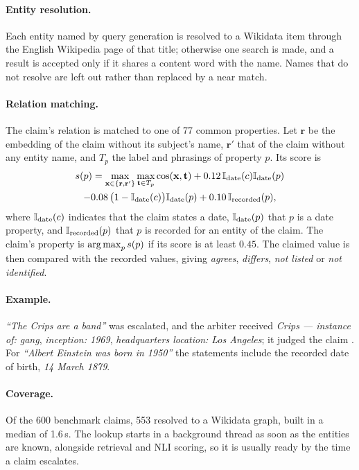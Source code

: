 \paragraph{Entity resolution.} Each entity named by query generation is resolved to a Wikidata item through the English Wikipedia page of that title; otherwise one search is made, and a result is accepted only if it shares a content word with the name. Names that do not resolve are left out rather than replaced by a near match.

\paragraph{Relation matching.} The claim's relation is matched to one of 77 common properties. Let $\mathbf{r}$ be the embedding of the claim without its subject's name, $\mathbf{r}'$ that of the claim without any entity name, and $T_p$ the label and phrasings of property $p$. Its score is
\begin{multline}
  s(p) = \max_{\mathbf{x} \in \{\mathbf{r}, \mathbf{r}'\}} \max_{\mathbf{t} \in T_p} \cos(\mathbf{x}, \mathbf{t}) + 0.12\,\mathbb{I}_{\text{date}}(c)\mathbb{I}_{\text{date}}(p) \\
  - 0.08\,\bigl(1 - \mathbb{I}_{\text{date}}(c)\bigr)\mathbb{I}_{\text{date}}(p) + 0.10\,\mathbb{I}_{\text{recorded}}(p),
\end{multline}
where $\mathbb{I}_{\text{date}}(c)$ indicates that the claim states a date, $\mathbb{I}_{\text{date}}(p)$ that $p$ is a date property, and $\mathbb{I}_{\text{recorded}}(p)$ that $p$ is recorded for an entity of the claim. The claim's property is $\operatorname*{arg\,max}_p s(p)$ if its score is at least $0.45$. The claimed value is then compared with the recorded values, giving \emph{agrees}, \emph{differs}, \emph{not listed} or \emph{not identified}.

\paragraph{Example.} \emph{``The Crips are a band''} was escalated, and the arbiter received \emph{Crips --- instance of: gang}, \emph{inception: 1969}, \emph{headquarters location: Los Angeles}; it judged the claim \Con. For \emph{``Albert Einstein was born in 1950''} the statements include the recorded date of birth, \emph{14 March 1879}.

\paragraph{Coverage.} Of the 600 benchmark claims, 553 resolved to a Wikidata graph, built in a median of 1.6\,s. The lookup starts in a background thread as soon as the entities are known, alongside retrieval and NLI scoring, so it is usually ready by the time a claim escalates.

